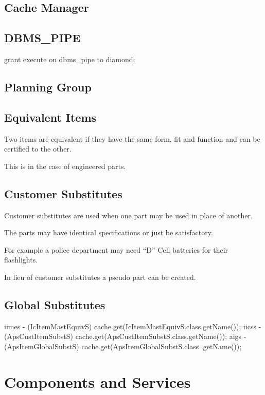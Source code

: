 \documentclass[letterpaper,10pt,english]{sphinxmanual}
\begin{document}
\section{Cache Manager}
\label{APS/ApsTechnicalReferenceBook:cache-manager}

\section{DBMS\_PIPE}
\label{APS/ApsTechnicalReferenceBook:dbms-pipe}
grant execute on dbms\_pipe to diamond;


\section{Planning Group}
\label{APS/ApsTechnicalReferenceBook:planning-group}

\section{Equivalent Items}
\label{APS/ApsTechnicalReferenceBook:equivalent-items}
Two items are equivalent if they have the same form, fit and function and can be certified
to the other.

This is in the case of engineered parts.


\section{Customer Substitutes}
\label{APS/ApsTechnicalReferenceBook:customer-substitutes}
Customer substitutes are used when one part may be used in place of another.

The parts may have identical specifications or just be satisfactory.

For example a police department may need ``D'' Cell batteries for their flashlights.

In lieu of customer substitutes a pseudo part can be created.


\section{Global Substitutes}
\label{APS/ApsTechnicalReferenceBook:global-substitutes}
iimes - (IcItemMastEquivS) cache.get(IcItemMastEquivS.class.getName());
iicss - (ApsCustItemSubstS)
cache.get(ApsCustItemSubstS.class.getName()); aigs -
(ApsItemGlobalSubstS) cache.get(ApsItemGlobalSubstS.class .getName());


\chapter{Components and Services}
\label{APS/ComponentsAndServices:components-and-services}\label{APS/ComponentsAndServices::doc}
\end{document}
